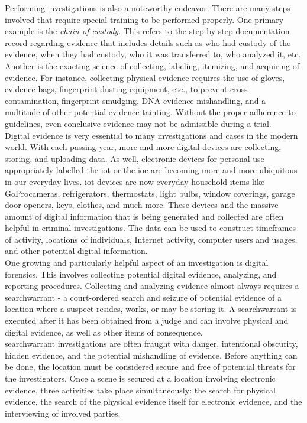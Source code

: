 \documentclass[12pt]{article}
\begin{document}
Performing investigations is also a noteworthy endeavor.  There are many steps involved that require special
training to be performed properly.  One primary example is the {\em chain of custody}.  This refers to the 
step-by-step documentation record regarding evidence that includes details such as who had custody of
the evidence, when they had custody, who it was transferred to, who analyzed it, etc. Another is the exacting
science of collecting, labeling, itemizing, and acquiring of evidence.
For instance, collecting physical evidence requires the use of gloves,
evidence bags, fingerprint-dusting equipment, etc., to prevent
cross-contamination, fingerprint smudging, DNA evidence mishandling,
and a multitude of other potential evidence tainting.  Without the
proper adherence to  guidelines, even conclusive evidence may not be
admissible during a trial.\\

Digital evidence is very essential to many investigations and cases in the modern world.
With each passing year, more and more digital devices are collecting, storing, and uploading data.  As
well, electronic devices for personal use appropriately labelled the \gls{iot} or
the \gls{ioe} are becoming more and more
ubiquitous in our everyday lives.  \gls{iot} devices are now everyday household items like GoPro\texttrademark cameras,
refrigerators, thermostats, light bulbs, window coverings, garage door openers, keys, clothes, and much more.
These devices and the massive amount of digital information that
is being generated and collected are often helpful in criminal investigations.  The data can be used to
construct timeframes of activity, locations of individuals, Internet activity, computer users and usages,
and other potential digital information.\\

One growing and particularly helpful aspect of an investigation is digital forensics.
This involves collecting potential digital evidence, analyzing, and reporting procedures.
Collecting and analyzing evidence almost always requires a \gls{searchwarrant} - a court-ordered search and
seizure of potential evidence of a location where a suspect resides, works, or may be storing it.
A \gls{searchwarrant} is executed after it has been obtained from a judge and can involve physical and
digital evidence, as well as other items of consequence.\\

\Gls{searchwarrant} investigations are often fraught with danger, intentional obscurity, hidden evidence, and
the potential mishandling of evidence.  Before anything can be done, the location must be considered
secure and free of potential threats for the investigators.  Once a scene is
secured at a location involving electronic evidence, three activities
take place simultaneously: the search for physical evidence, the search of the physical evidence
itself for electronic evidence, and the interviewing of involved parties.\\
\end{document}
